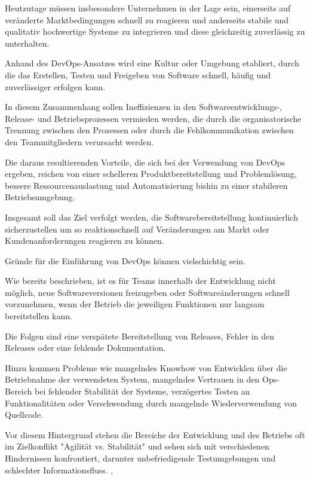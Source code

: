 Heutzutage müssen insbesondere Unternehmen in der Lage sein, einerseits auf veränderte Marktbedingungen schnell zu reagieren und anderseits stabile und qualitativ hochwertige Systeme zu integrieren und diese gleichzeitig zuverlässig zu unterhalten. \cite{humble_why_2011} 

Anhand des DevOps-Ansatzes wird eine Kultur oder Umgebung etabliert, durch die das Erstellen, Testen und Freigeben von Software schnell, häufig und zuverlässiger erfolgen kann. \cite[S.xxviii]{sharma_devops_2017}

In diesem Zusammenhang sollen Ineffizienzen in den Softwareentwicklungs-, Release- und Betriebsprozessen vermieden werden, die durch die organisatorische Trennung zwischen den Prozessen \cite{lwakatare_devops_2019} oder durch die Fehlkommunikation zwischen den Teammitgliedern\cite{ebert_devops_2016} verursacht werden. 

Die daraus resultierenden Vorteile, die sich bei der Verwendung von DevOps ergeben, reichen von einer schelleren Produktbereitstellung und Problemlösung, bessere Ressourcenauslastung und Automatisierung bishin zu einer stabileren Betriebsumgebung.    

Insgesamt soll das Ziel verfolgt werden, die Softwarebereitstellung kontinuierlich sicherzustellen um so reaktionschnell auf Veränderungen am Markt oder Kundenanforderungen reagieren zu können.

Gründe für die Einführung von DevOps können vielschichtig sein.

Wie bereits beschrieben, ist es für Teams innerhalb der Entwicklung nicht möglich, neue Softwareversionen freizugeben oder Softwareänderungen schnell vorzunehmen, wenn der Betrieb die jeweiligen Funktionen nur langsam bereitstellen kann. \cite[S. 7,8]{sharma_devops_2017} 

Die Folgen sind eine verspätete Bereitstellung von Releases, Fehler in den Releases oder eine fehlende Dokumentation. \cite[S. 24]{alt_innovationsorientiertes_2017}

Hinzu kommen Probleme wie mangelndes Knowhow von Entwicklen über die Betriebnahme der verwendeten System, mangelndes Vertrauen in den Ops-Bereich bei fehlender Stabilität der Systeme, verzögertes Testen an Funktionalitäten oder Verschwendung durch mangelnde Wiederverwendung von Quellcode. \cite{humble_why_2011}  

Vor diesem Hintergrund stehen die Bereiche der Entwicklung und des Betriebs oft im Zielkonflikt "Agilität vs. Stabilität" und sehen sich mit verschiedenen Hindernissen konfrontiert, darunter unbefriedigende Testumgebungen und schlechter Informationsfluss. \cite{lwakatare_devops_2019} \cite[S. 8]{sharma_devops_2017}, \cite{konig_devopswelcome_2019}

